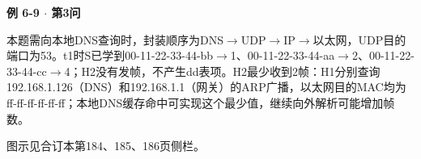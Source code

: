 {\color{ink}\bfseries 例 6-9 \(\cdot \) 第3问}\par\vspace{1bp}本题需向本地DNS查询时，封装顺序为DNS\(\to \)UDP\(\to \)IP\(\to \)以太网，UDP目的端口为53。t1时S已学到00-11-22-33-44-bb\(\to \)1、00-11-22-33-44-aa\(\to \)2、00-11-22-33-44-cc\(\to \)4；H2没有发帧，不产生dd表项。H2最少收到2帧：H1分别查询192.168.1.126（DNS）和192.168.1.1（网关）的ARP广播，以太网目的MAC均为ff-ff-ff-ff-ff-ff；本地DNS缓存命中可实现这个最少值，继续向外解析可能增加帧数。\par {\color{ink}图示见合订本第184、185、186页侧栏。}
